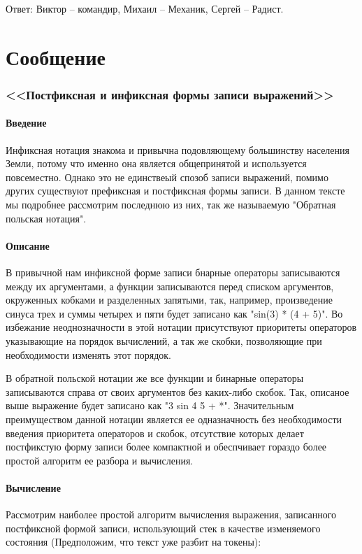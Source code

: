 \documentclass[12pt, a4paper]{article}
\begin{document}
  Ответ: Виктор -- командир, Михаил -- Механик, Сергей -- Радист.



  \pagebreak

  \part{Сообщение}
  \section{<<Постфиксная и инфиксная формы записи выражений>>}
  \subsection{Введение}
  Инфиксная нотация знакома и привычна подовляющему большинству населения 
  Земли, потому что именно она является общепринятой и используется повсеместно.
  Однако это не единствеый спозоб записи выражений, помимо других существуют 
  префиксная и постфиксная формы записи. В данном тексте мы подробнее рассмотрим 
  последнюю из них, так же называемую "Обратная польская нотация".

  \subsection{Описание}
  В привычной нам инфиксной форме записи бнарные операторы записываются между 
  их аргументами, а функции записываются перед списком аргументов, окруженных 
  кобками и разделенных запятыми, так, например, произведение синуса трех и суммы 
  четырех и пяти будет записано как "sin(3) * (4 + 5)". Во избежание неоднозначности 
  в этой нотации присутствуют приоритеты операторов указывающие на порядок вычислений,
  а так же скобки, позволяющие при необходимости изменять этот порядок.

  В обратной польской нотации же все функции и бинарные операторы записываются 
  справа от своих аргументов без каких-либо скобок. Так, описаное выше выражение 
  будет записано как "3 sin 4 5 + *". Значительным преимуществом данной нотации 
  является ее одназначность без необходимости введения приоритета операторов и
  скобок, отсутствие которых делает постфикстую форму записи более компактной 
  и обеспчивает гораздо более простой алгоритм ее разбора и вычисления.

  \subsection{Вычисление} 
  Рассмотрим наиболее простой алгоритм вычисления выражения, записанного 
  постфиксной формой записи, использующий стек в качестве изменяемого состояния
  (Предположим, что текст уже разбит на токены):
\end{document}

